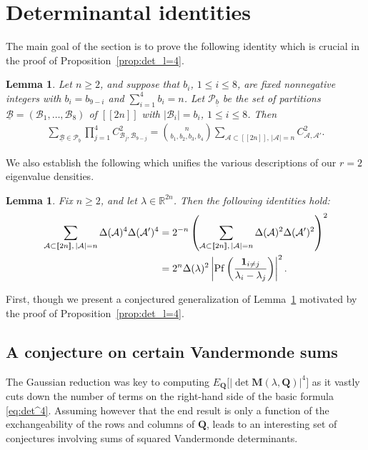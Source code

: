 \documentclass[pdftex]{sigma}
\numberwithin{equation}{section}
\newtheorem{Lemma}[Theorem]{Lemma}
\theoremstyle{definition}
\newcommand{\R}{{\mathbb R}}
\newcommand{\cP}{{\mathcal P}}
\newcommand{\ind}{{\bf{1}}}
\newcommand{\cB}{\mathcal{B}}
\newcommand{\Pf}{\operatorname{Pf}}
\newcommand{\cA}{\mathcal{A}}
\newcommand{\lst}[1]{[\![#1 ]\!]}
\newcommand{\mbf}[1]{\mathbf{#1}}
\begin{document}
\section{Determinantal identities}
\label{sec:det_identities}


The main goal of the section is to prove the following identity which is crucial in the proof of Proposition~\ref{prop:det_l=4}.

\begin{Lemma}\label{lem:Cauchy_cycle}
Let $n\ge 2$, and suppose that $b_i$, $1\le i\le 8$, are fixed nonnegative integers with $b_i=b_{9-i}$ and $\sum_{i=1}^4 b_i=n$. Let $\cP_{\underline{b}}$ be the set of partitions $\underline{\cB}=(\cB_1,\dots, \cB_8)$ of $\lst{2n}$ with $|\cB_i|=b_i$, $1\le i\le 8$. Then
\begin{align}\label{eq:Cauchy_sum_1}
 \sum_{\underline{\cB}\in \cP_{\underline{b}}} \prod_{j=1}^4 C_{\cB_j,\cB_{9-j}}^2 =\binom{n}{b_1,b_2,b_3,b_4} \sum_{\cA\subset \lst{2n},\, |\cA|=n} C_{\cA,\cA'}^2.
\end{align}
\end{Lemma}

We also establish the following which unifies the various descriptions of our $r=2$ eigenvalue densities.

\begin{Lemma}\label{lem:det4_identities}
 Fix $n\ge 2$, and let ${\lambda}\in \R^{2n}$. Then the following identities hold:
 \begin{align*}%
 \sum_{\cA\subset \lst{2n}, \, |\cA|=n} \Delta (\cA)^4 \Delta (\cA')^4
 & =2^{-n} \left(\sum_{\cA\subset \lst{2n},\, |\cA|=n} \Delta (\cA)^2 \Delta (\cA')^2\right)^2 \\
 & =2^n \Delta(\lambda)^2 \left|\Pf\left(\frac{\ind_{i\neq j}}{\lambda_i-\lambda_j}\right)\right|^2. %
 \end{align*}
\end{Lemma}

First, though we present a conjectured generalization of Lemma~\ref{lem:Cauchy_cycle} motivated by the proof of Proposition~\ref{prop:det_l=4}.

\subsection{A conjecture on certain Vandermonde sums}

The Gaussian reduction was key to computing $E_{\boldsymbol{Q}} \bigl[|{\det \mbf{M}({\lambda}, \mbf{Q})}|^4\bigr]$
as it vastly cuts down the number of terms on the right-hand side of the basic formula \eqref{eq:det^4}. Assuming however that the end result is only a function of the exchangeability of the
rows and columns of $\mbf{Q}$,
leads to an interesting set of conjectures involving sums of squared Vandermonde determinants.
\end{document}
